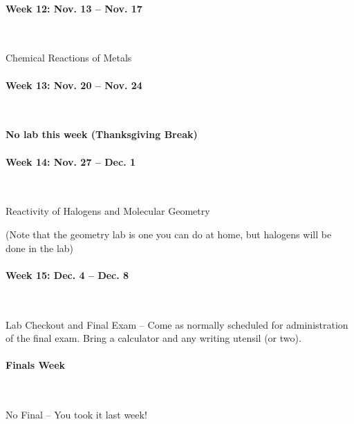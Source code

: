 \documentclass[12pt, letterpaper]{article}
\begin{document}
\paragraph{Week 12: Nov. 13 -- Nov. 17}~

Chemical Reactions of Metals

\paragraph{Week 13: Nov. 20 -- Nov. 24}~

\textbf{No lab this week (Thanksgiving Break)}

\paragraph{Week 14: Nov. 27 -- Dec. 1}~

Reactivity of Halogens and Molecular Geometry

(Note that the geometry lab is one you can do at home, but halogens will be done in the lab)

\paragraph{Week 15: Dec. 4 -- Dec. 8}~

Lab Checkout and Final Exam -- Come as normally scheduled for administration of the final exam. Bring a calculator and any writing utensil (or two).

\paragraph{Finals Week}~

No Final -- You took it last week!
\end{document}
